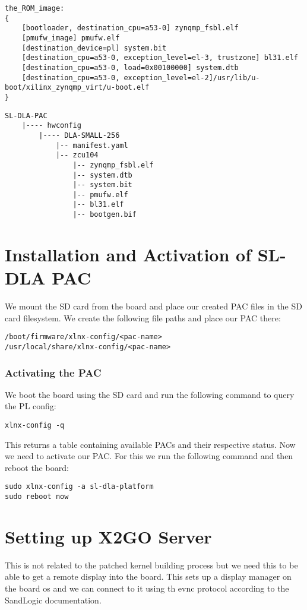 \documentclass{article}
\begin{document}
\begin{lstlisting}[caption=bootgen.bif]
the_ROM_image:
{
    [bootloader, destination_cpu=a53-0] zynqmp_fsbl.elf
    [pmufw_image] pmufw.elf
    [destination_device=pl] system.bit
    [destination_cpu=a53-0, exception_level=el-3, trustzone] bl31.elf
    [destination_cpu=a53-0, load=0x00100000] system.dtb
    [destination_cpu=a53-0, exception_level=el-2]/usr/lib/u-boot/xilinx_zynqmp_virt/u-boot.elf
}
\end{lstlisting}

\begin{lstlisting}[caption=file structure for PAC]
SL-DLA-PAC
    |---- hwconfig
        |---- DLA-SMALL-256
            |-- manifest.yaml
            |-- zcu104
                |-- zynqmp_fsbl.elf
                |-- system.dtb
                |-- system.bit
                |-- pmufw.elf
                |-- bl31.elf
                |-- bootgen.bif

\end{lstlisting}
\section{Installation and Activation of SL-DLA PAC}
We mount the SD card from the board and place our created PAC files in the SD card filesystem. We create the
following file paths and place our PAC there:
\begin{lstlisting}
/boot/firmware/xlnx-config/<pac-name>
/usr/local/share/xlnx-config/<pac-name>
\end{lstlisting}

\subsubsection{Activating the PAC}
We boot the board using the SD card and run the following command to query the PL config:
\begin{lstlisting}
xlnx-config -q
\end{lstlisting}

This returns a table containing available PACs and their respective status. Now we need to activate our PAC. For
this we run the following command and then reboot the board:
\begin{lstlisting}
sudo xlnx-config -a sl-dla-platform
sudo reboot now
\end{lstlisting}

\section{Setting up X2GO Server}
This is not related to the patched kernel building process but we need this to be able to get a remote display
into the board. This sets up a display manager on the board os and we can connect to it using th evnc protocol
according to the SandLogic documentation.
\end{document}
